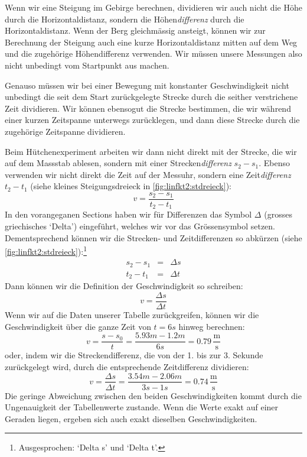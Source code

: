 \documentclass[%
11pt,%
twoside,%
titlepage,%
german,%
headsepline%
]{scrartcl}
\newcommand{\ufrac}[2]{\ensuremath{\,\frac{\mathrm{#1}}{\mathrm{#2}}}}
\begin{document}
{Wenn wir eine Steigung im Gebirge berechnen, dividieren wir auch nicht die H\"ohe durch die Horizontaldistanz, sondern die H\"ohen\emph{differenz} durch die Horizontaldistanz. Wenn der Berg gleichm\"assig ansteigt, k\"onnen wir zur Berechnung der Steigung auch eine kurze Horizontaldistanz mitten auf dem Weg und die zugeh\"orige H\"ohendifferenz verwenden. Wir m\"ussen unsere Messungen also nicht unbedingt vom Startpunkt aus machen.

Genauso m\"ussen wir bei einer Bewegung mit konstanter Geschwindigkeit nicht unbedingt die seit dem Start zur\"uckgelegte Strecke durch die seither verstrichene Zeit dividieren. Wir k\"onnen ebensogut die Strecke bestimmen, die wir w\"ahrend einer kurzen Zeitspanne unterwegs zur\"ucklegen, und dann diese Strecke durch die zugeh\"orige Zeitspanne dividieren.

Beim H\"utchenexperiment arbeiten wir dann nicht direkt mit der Strecke, die wir auf dem Massstab ablesen, sondern mit einer Strecken\emph{differenz} $s_2-s_1$. Ebenso verwenden wir nicht direkt die Zeit auf der Messuhr, sondern eine Zeit\emph{differenz} $t_2-t_1$ (siehe kleines Steigungsdreieck in \ref{fig:linfkt2:stdreieck}):
\begin{displaymath}
  v = \frac{s_2-s_1}{t_2-t_1}
\end{displaymath}
In den vorangeganen Sections haben wir f\"ur Differenzen das Symbol $\Delta$ (grosses griechisches `Delta') eingef\"uhrt, welches wir vor das Gr\"ossensymbol setzen. Dementsprechend k\"onnen wir die Strecken- und Zeitdifferenzen so abk\"urzen (siehe \ref{fig:linfkt2:stdreieck}):\footnote{Ausgesprochen: `Delta s' und `Delta t'.}
\begin{eqnarray*}
  s_2-s_1 & = & \Delta s \\
  t_2-t_1 & = & \Delta t
\end{eqnarray*}
Dann k\"onnen wir die Definition der Geschwindigkeit so schreiben:
\begin{displaymath}
  v = \frac{\Delta s}{\Delta t}
\end{displaymath}
Wenn wir auf die Daten unserer Tabelle zur\"uckgreifen, k\"onnen wir die Geschwindigkeit \"uber die ganze Zeit von  $t=6\unit{s}$ hinweg berechnen:
\begin{displaymath}
  v= \frac{s - s_0}{t} = \frac{5.93\unit{m}-1.2\unit{m}}{6\unit{s}}=0.79\ufrac{m}{s}
\end{displaymath}
oder, indem wir die Streckendifferenz, die von der 1. bis zur 3. Sekunde zur\"uckgelegt wird, durch die entsprechende Zeitdifferenz dividieren:
\begin{displaymath}
  v= \frac{\Delta s}{\Delta t}=\frac{3.54\unit{m}-2.06\unit{m}}{3\unit{s}-1\unit{s}}=0.74\ufrac{m}{s}
\end{displaymath}
Die geringe Abweichung zwischen den beiden Geschwindigkeiten kommt durch die Ungenauigkeit der Tabellenwerte zustande. Wenn die Werte exakt auf einer Geraden liegen, ergeben sich auch exakt dieselben Geschwindigkeiten.

}
\end{document}
